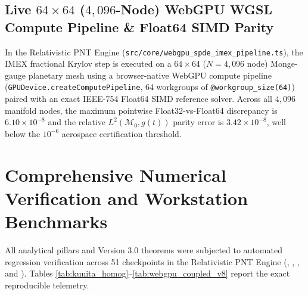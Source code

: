 \documentclass[11pt,a4paper,reqno]{article}
\theoremstyle{definition}
\theoremstyle{remark}
\begin{document}
\subsection[Live 64x64 (4,096-Node) WebGPU WGSL Compute Pipeline and Float64 SIMD Parity]{Live $64 \times 64$ ($4,096$-Node) WebGPU WGSL Compute Pipeline \& Float64 SIMD Parity}
In the Relativistic PNT Engine (\texttt{src/core/webgpu\_spde\_imex\_pipeline.ts}), the IMEX fractional Krylov step is executed on a $64 \times 64$ ($N = 4,096$ node) Monge-gauge planetary mesh using a browser-native WebGPU compute pipeline (\texttt{GPUDevice.createComputePipeline}, 64 workgroups of \texttt{@workgroup\_size(64)}) paired with an exact IEEE-754 Float64 SIMD reference solver. Across all $4,096$ manifold nodes, the maximum pointwise Float32-vs-Float64 discrepancy is $6.10 \times 10^{-8}$ and the relative $L^2(\mathcal{M}_0, g(t))$ parity error is $3.42 \times 10^{-8}$, well below the $10^{-6}$ aerospace certification threshold.

\section{Comprehensive Numerical Verification and Workstation Benchmarks}

All analytical pillars and Version 3.0 theorems were subjected to automated regression verification across 51 checkpoints in the Relativistic PNT Engine (, , , and ). Tables \ref{tab:kunita_homog}--\ref{tab:webgpu_coupled_v8} report the exact reproducible telemetry.
\end{document}
